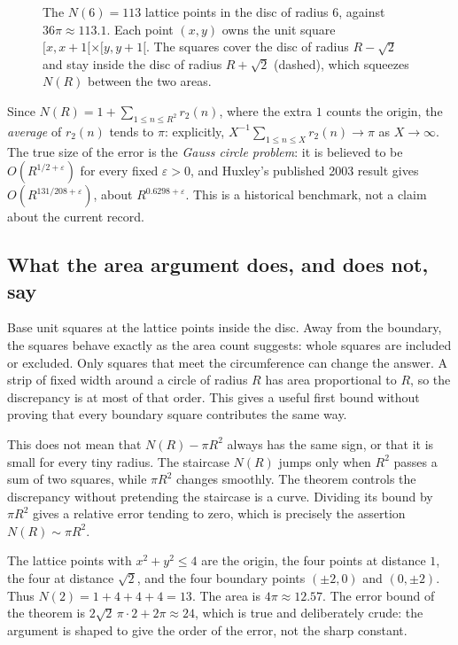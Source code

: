 \begin{figure}[ht]
\centering
{}
\caption{The $N(6)=113$ lattice points in the disc of radius $6$, against $36\pi\approx113.1$. Each point $(x,y)$ owns the unit square $[x,x+1[\times[y,y+1[$. The squares cover the disc of radius $R-\sqrt2$ and stay inside the disc of radius $R+\sqrt2$ (dashed), which squeezes $N(R)$ between the two areas.}
\label{fig:disc}
\end{figure}

Since $N(R)=1+\sum_{1\le n\le R^2}r_2(n)$, where the extra $1$ counts the origin, the \emph{average} of $r_2(n)$ tends to $\pi$: explicitly, $X^{-1}\sum_{1\le n\le X}r_2(n)\to\pi$ as $X\to\infty$. The true size of the error is the \emph{Gauss circle problem}: it is believed to be $O(R^{1/2+\varepsilon})$ for every fixed $\varepsilon>0$, and Huxley's published 2003 result gives $O(R^{131/208+\varepsilon})$, about $R^{0.6298+\varepsilon}$. This is a historical benchmark, not a claim about the current record.

\subsection*{What the area argument does, and does not, say}
Base unit squares at the lattice points inside the disc. Away from the boundary, the squares behave exactly as the area count suggests: whole squares are included or excluded. Only squares that meet the circumference can change the answer. A strip of fixed width around a circle of radius $R$ has area proportional to $R$, so the discrepancy is at most of that order. This gives a useful first bound without proving that every boundary square contributes the same way.

This does not mean that $N(R)-\pi R^2$ always has the same sign, or that it is small for every tiny radius. The staircase $N(R)$ jumps only when $R^2$ passes a sum of two squares, while $\pi R^2$ changes smoothly. The theorem controls the discrepancy without pretending the staircase is a curve. Dividing its bound by $\pi R^2$ gives a relative error tending to zero, which is precisely the assertion $N(R)\sim\pi R^2$.

\begin{examplex}
The lattice points with $x^2+y^2\le4$ are the origin, the four points at distance $1$, the four at distance $\sqrt2$, and the four boundary points $(\pm2,0)$ and $(0,\pm2)$. Thus $N(2)=1+4+4+4=13$. The area is $4\pi\approx12.57$. The error bound of the theorem is $2\sqrt 2\,\pi\cdot 2+2\pi\approx 24$, which is true and deliberately crude: the argument is shaped to give the order of the error, not the sharp constant.
\end{examplex}

